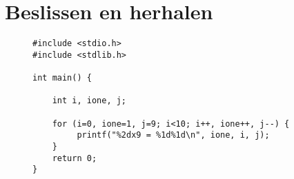 \chapter{Beslissen en herhalen}
\label{cha:programmabesturing}
\thispagestyle{empty}


\begin{figure}[!ht]
\begin{lstlisting}[caption=Afdrukken van de tafel van 9 met behulp van de komma-operator.]
#include <stdio.h>
#include <stdlib.h>

int main() {

    int i, ione, j;

    for (i=0, ione=1, j=9; i<10; i++, ione++, j--) {
         printf("%2dx9 = %1d%1d\n", ione, i, j);
    }
    return 0;
}
\end{lstlisting}
\end{figure}